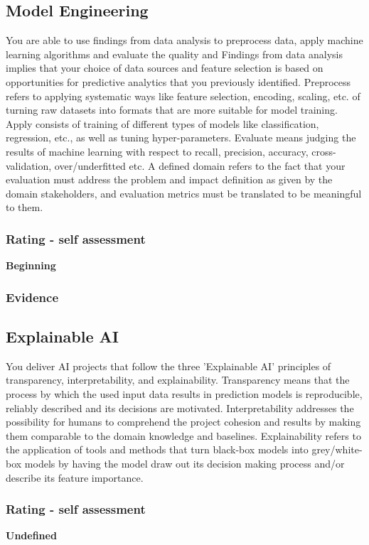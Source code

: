 \documentclass[a4paper, 11pt]{article}
\begin{document}
\subsection{Model Engineering}
You are able to use findings from data analysis to preprocess data, apply machine learning algorithms and evaluate the quality and 
\medbreak
Findings from data analysis implies that your choice of data sources and feature selection is based on opportunities for predictive analytics that you previously identified. Preprocess refers to applying systematic ways like feature selection, encoding, scaling, etc. of turning raw datasets into formats that are more suitable for model training. Apply consists of training of different types of models like classification, regression, etc., as well as tuning hyper-parameters. Evaluate means judging the results of machine learning with respect to recall, precision, accuracy, cross-validation, over/underfitted etc. A defined domain refers to the fact that your evaluation must address the problem and impact definition as given by the domain stakeholders, and evaluation metrics must be translated to be meaningful to them.

\subsubsection{Rating - self assessment}
\textbf{Beginning} 
\subsubsection{Evidence}

\subsection{Explainable AI}
You deliver AI projects that follow the three 'Explainable AI' principles of transparency, interpretability, and explainability. 
\medbreak
Transparency means that the process by which the used input data results in prediction models is reproducible, reliably described and its decisions are motivated. Interpretability addresses the possibility for humans to comprehend the project cohesion and results by making them comparable to the domain knowledge and baselines. Explainability refers to the application of tools and methods that turn black-box models into grey/white-box models by having the model draw out its decision making process and/or describe its feature importance. 

\subsubsection{Rating - self assessment}
\textbf{Undefined} 
\end{document}
